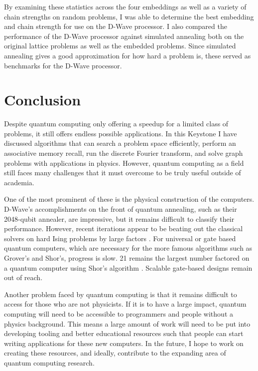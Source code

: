 \documentclass[11pt]{report}
\newcommand{\?}{\stackrel{?}{=}}
\begin{document}
By examining these statistics across the four embeddings as well as a variety of chain strengths on random problems, I was able to determine the best embedding and chain strength for use on the D-Wave processor. I also compared the performance of the D-Wave processor against simulated annealing both on the original lattice problems as well as the embedded problems. Since simulated annealing gives a good approximation for how hard a problem is, these served as benchmarks for the D-Wave processor.

\chapter{Conclusion}

Despite quantum computing only offering a speedup for a limited class of problems, it still offers endless possible applications. In this Keystone I have discussed algorithms that can search a problem space efficiently, perform an associative memory recall, run the discrete Fourier transform, and solve graph problems with applications in physics. However, quantum computing as a field still faces many challenges that it must overcome to be truly useful outside of academia.

One of the most prominent of these is the physical construction of the computers. D-Wave's accomplishments on the front of quantum annealing, such as their 2048-qubit annealer, are impressive, but it remains difficult to classify their performance. However, recent iterations appear to be beating out the classical solvers on hard Ising problems by large factors \cite{googleblog}. For universal or gate based quantum computers, which are necessary for the more famous algorithms such as Grover's and Shor's, progress is slow. 21 remains the largest number factored on a quantum computer using Shor's algorithm \cite{martinlopez}. Scalable gate-based designs remain out of reach.

Another problem faced by quantum computing is that it remains difficult to access for those who are not physicists. If it is to have a large impact, quantum computing will need to be accessible to programmers and people without a physics background. This means a large amount of work will need to be put into developing tooling and better educational resources such that people can start writing applications for these new computers. In the future, I hope to work on creating these resources, and ideally, contribute to the expanding area of quantum computing research. 
\end{document}
